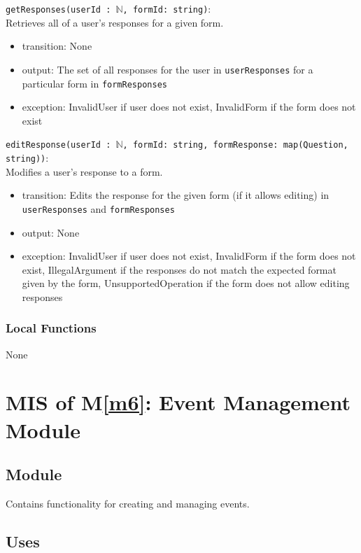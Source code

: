 \documentclass[12pt, titlepage]{article}
\begin{document}
\noindent \texttt{getResponses(userId : $\mathbb{N}$, formId: string)}: \\
Retrieves all of a user's responses for a given form.
\begin{itemize}
\item transition: None
\item output: The set of all responses for the user in \texttt{userResponses} for a particular form in \texttt{formResponses}
\item exception: InvalidUser if user does not exist, InvalidForm if the form does not exist
\end{itemize}

\noindent \texttt{editResponse(userId : $\mathbb{N}$, formId: string, \newline formResponse: map(Question, string))}: \\
Modifies a user's response to a form.
\begin{itemize}
\item transition: Edits the response for the given form (if it allows editing) in \texttt{userResponses} and \texttt{formResponses}
\item output: None
\item exception: InvalidUser if user does not exist, InvalidForm if the form does not exist, IllegalArgument if the responses do not match the expected format given by the form, UnsupportedOperation if the form does not allow editing responses
\end{itemize}

\subsubsection{Local Functions}

None

\newpage

\section{MIS of M\ref{m6}: Event Management Module}

\subsection{Module}

Contains functionality for creating and managing events.

\subsection{Uses}
\end{document}
